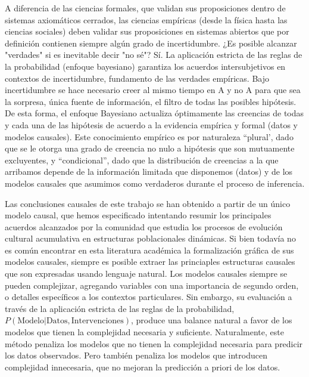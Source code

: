 \documentclass[a4paper,11pt]{book}
\theoremstyle{definition}
\begin{document}
A diferencia de las ciencias formales, que validan sus proposiciones dentro de sistemas axiomáticos cerrados, las ciencias empíricas (desde la física hasta las ciencias sociales) deben validar sus proposiciones en sistemas abiertos que por definición contienen siempre algún grado de incertidumbre.
%
¿Es posible alcanzar "verdades" si es inevitable decir "no sé"? Sí.
%
La aplicación estricta de las reglas de la probabilidad (enfoque bayesiano) garantiza los acuerdos intersubjetivos en contextos de incertidumbre, fundamento de las verdades empíricas.
%
 Bajo incertidumbre se hace necesario creer al mismo tiempo en A y no A para que sea la sorpresa, única fuente de información, el filtro de todas las posibles hipótesis.
%
De esta forma, el enfoque Bayesiano actualiza óptimamente las creencias de todas y cada una de las hipótesis de acuerdo a la evidencia empírica y formal (datos y modelos causales).
%
Este conocimiento empírico es por naturaleza ``plural', dado que se le otorga una grado de creencia no nulo a hipótesis que son mutuamente excluyentes, y ``condicional'', dado que la distribución de creencias a la que arribamos depende de la información limitada que disponemos (datos) y de los modelos causales que asumimos como verdaderos durante el proceso de inferencia.

Las conclusiones causales de este trabajo se han obtenido a partir de un único modelo causal, que hemos especificado intentando resumir los principales acuerdos alcanzados por la comunidad que estudia los procesos de evolución cultural acumulativa en estructuras poblacionales dinámicas.
%
Si bien todavía no es común encontrar en esta literatura académica la formalización gráfica de sus modelos causales, siempre es posible extraer las princiaples estructuras causales que son expresadas usando lenguaje natural.
%
Los modelos causales siempre se pueden complejizar, agregando variables con una importancia de segundo orden, o detalles específicos a los contextos particulares.
%
Sin embargo, su evaluación a través de la aplicación estricta de las reglas de la probabilidad, $P(\text{Modelo}|\text{Datos},\text{Intervenciones})$, produce una balance natural a favor de los modelos que tienen la complejidad necesaria y suficiente.
%
Naturalmente, este método penaliza los modelos que no tienen la complejidad necesaria para predicir los datos observados.
%
Pero también penaliza los modelos que introducen complejidad innecesaria, que no mejoran la predicción a priori de los datos.
\end{document}
